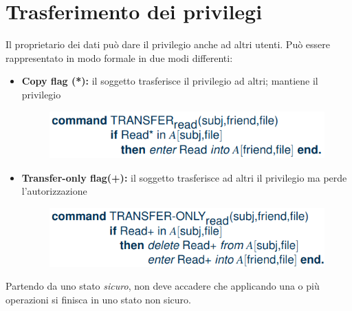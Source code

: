 \documentclass{report}
\begin{document}
\section{Trasferimento dei privilegi}
Il proprietario dei dati può dare il privilegio anche ad altri utenti.
Può essere rappresentato in modo formale in due modi differenti:
\begin{itemize}
    \item \textbf{Copy flag (*):} il soggetto trasferisce il privilegio ad altri; mantiene il privilegio
    \begin{figure}[H]
        \centering
        \includegraphics[width=0.6\linewidth]{images/transfer1.png}
    \end{figure}
    \item \textbf{Transfer-only flag(+):} il soggetto trasferisce ad altri il privilegio ma perde l'autorizzazione
    \begin{figure}[H]
        \centering
        \includegraphics[width=0.6\linewidth]{images/transfer2.png}
    \end{figure}
\end{itemize}

\noindent Partendo da uno stato \textit{sicuro}, non deve accadere che applicando una o più operazioni 
si finisca in uno stato non sicuro.
\end{document}
